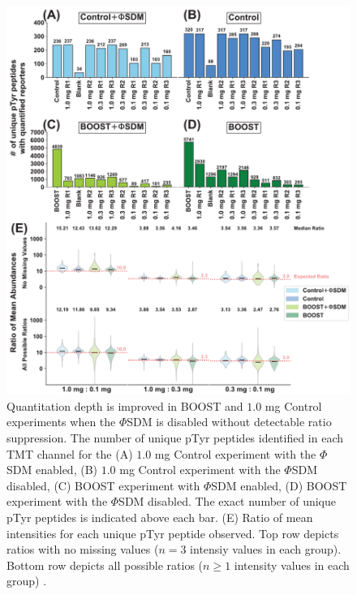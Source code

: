 \documentclass[journal=jprobs,manuscript=article]{achemso}
\begin{document}
\begin{figure}[!h]
\centering
\includegraphics[width=150mm]{figures/main_figs/depth_nans.pdf}
\caption{Quantitation depth is improved in BOOST and $1.0$ mg Control experiments when the $\Phi$SDM is disabled without detectable ratio suppression. The number of unique pTyr peptides identified in each TMT channel for the (A) $1.0$ mg Control experiment with the $\Phi$SDM enabled, (B) $1.0$ mg Control experiment with the $\Phi$SDM disabled, (C) BOOST experiment with $\Phi$SDM enabled, (D) BOOST experiment with the $\Phi$SDM disabled. The exact number of unique pTyr peptides is indicated above each bar. (E) Ratio of mean intensities for each unique pTyr peptide observed. Top row depicts ratios with no missing values ($n=3$ intensiy values in each group). Bottom row depicts all possible ratios ($n\geq1$ intensity values in each group)  .}\label{depth_nans}
\end{figure}
\end{document}

